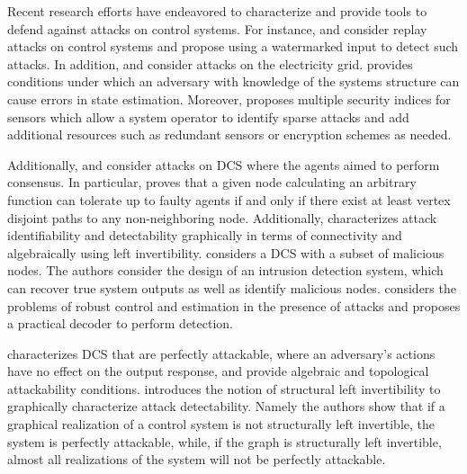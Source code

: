 \documentclass[letterpaper, 10 pt, conference]{ieeeconf}
\begin{document}
Recent research efforts have endeavored to characterize and provide tools to defend against attacks on control systems. For instance, \cite{Mo2014} and \cite{Mo2009R} consider replay attacks on control systems and propose using a watermarked input to detect such attacks. In addition, \cite{liu2009} and \cite{henrik2010} consider attacks on the electricity grid.  \cite{liu2009}  provides conditions under which an adversary with knowledge of the systems structure can cause errors in state estimation. Moreover, \cite{henrik2010} proposes multiple security indices for sensors which allow a system operator to identify sparse attacks and add additional resources such as redundant sensors or encryption schemes as needed. 

Additionally, \cite{PasqualettiConsensusUnreliable} and \cite{Sundaram_function} consider attacks on DCS where the agents aimed to perform consensus. In particular, \cite{Sundaram_function}  proves that a given node calculating an arbitrary function can tolerate up to  faulty agents if and only if there exist at least  vertex disjoint paths to any non-neighboring node. Additionally, \cite{PasqualettiConsensusUnreliable} characterizes attack identifiability and detectability graphically in terms of connectivity and algebraically using left invertibility.  \cite{wirelesscontrol} considers a DCS with a subset of malicious nodes.  The authors consider the design of an intrusion detection system, which can recover true system outputs as well as identify malicious nodes. \cite{Fawzi_secure_cont_est} considers the problems of robust control and estimation in the presence of attacks and proposes a practical decoder to perform detection.

\cite{Cam2014}  characterizes DCS that are perfectly attackable, where an adversary's actions have no effect on the output response, and provide algebraic and topological attackability conditions. \cite{PasqualettiAttack} introduces the notion of structural left invertibility to graphically characterize attack detectability. Namely the authors show that if a graphical realization of a control system is not structurally left invertible, the system is perfectly attackable, while, if the graph is structurally left invertible, almost all realizations of the system will not be perfectly attackable. 
\end{document}

